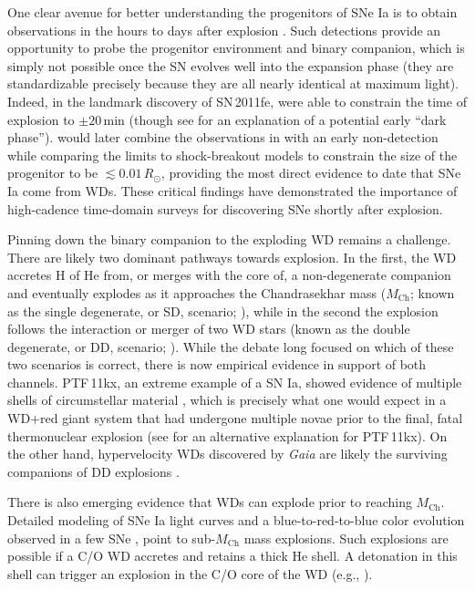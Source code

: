 \documentclass[twocolumn]{aastex63}
\begin{document}
One clear avenue for better understanding the progenitors of SNe Ia is to
obtain observations in the hours to days after explosion \citep{Maoz14}. Such
detections provide an opportunity to probe the progenitor environment and
binary companion, which is simply not possible once the SN evolves well into
the expansion phase (they are standardizable precisely because they are all
nearly identical at maximum light). Indeed, in the landmark discovery of
SN\,2011fe, \citet{Nugent11} were able to constrain the time of explosion to
$\pm 20$\,min (though see \citealt{Piro13,Piro14} for an explanation of a
potential early ``dark phase''). \citet{Bloom12a} would later combine the
observations in \citet{Nugent11} with an early non-detection while comparing
the limits to shock-breakout models to constrain the size of the progenitor to
be $\lesssim 0.01\,R_\odot$, providing the most direct evidence to date that
SNe Ia come from WDs. These critical findings have demonstrated the importance
of high-cadence time-domain surveys for discovering SNe shortly after
explosion.

Pinning down the binary companion to the exploding WD remains a challenge.
There are likely two dominant pathways towards explosion. In the first, the WD
accretes H of He from, or merges with the core of, a non-degenerate companion
and eventually explodes as it approaches the Chandrasekhar mass
($M_\mathrm{Ch}$; known as the single degenerate, or SD, scenario;
\citealt{Whelan73}), while in the second the explosion follows the interaction
or merger of two WD stars (known as the double degenerate, or DD, scenario;
\citealt{Webbink84}). While the debate long focused on which of these two
scenarios is correct, there is now empirical evidence in support of both
channels. PTF\,11kx, an extreme example of a SN Ia, showed evidence of
multiple shells of circumstellar material \citep{Dilday12}, which is precisely
what one would expect in a WD$+$red giant system that had undergone multiple
novae prior to the final, fatal thermonuclear explosion (see \citealt{Soker13}
for an alternative explanation for PTF\,11kx). On the other hand,
hypervelocity WDs discovered by \textit{Gaia} are likely the surviving
companions of DD explosions \citep{Shen18}.

There is also emerging evidence that WDs can explode prior to reaching
$M_\mathrm{Ch}$. Detailed modeling of SNe Ia light curves \citep{Scalzo14a}
and a blue-to-red-to-blue color evolution observed in a few SNe
\citep{Jiang17,Noebauer17,Polin19,De19}, point to sub-$M_\mathrm{Ch}$ mass
explosions. Such explosions are possible if a C/O WD accretes and retains a
thick He shell. A detonation in this shell can trigger an explosion in the C/O
core of the WD (e.g., \citealt{Nomoto82,Nomoto82a}).
\end{document}

